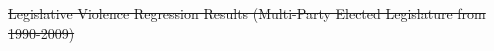 \documentclass[a4paper]{article}\usepackage[]{graphicx}\usepackage[]{color}
\providecommand{\DIFdeltex}[1]{{\protect\color{red}\sout{#1}}}                      %
\providecommand{\DIFdelbegin}{} %
\providecommand{\DIFdel}[1]{\texorpdfstring{\DIFdeltex{#1}}{}} %
\begin{document}
\DIFdelbegin %
{%
\DIFdel{Legislative Violence Regression Results (Multi-Party Elected Legislature from 1990-2009)}}

\end{document}
